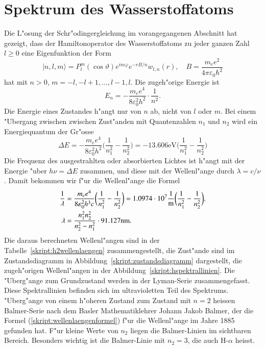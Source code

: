 \section{Spektrum des Wasserstoffatoms}
Die L"osung der Schr"odingergleichung im vorangegangenen Abschnitt
hat gezeigt, dass der Hamiltonoperator des Wasserstoffatoms zu jeder ganzen
Zahl $l\ge 0$ eine Eigenfunktion der Form
\[
|n,l,m\rangle
=
P_l^m(\cos\vartheta) e^{im\varphi}e^{-rB/n}w_{l,n}(r)
,\quad
B=\frac{m_ee^2}{4\pi\varepsilon_0\hbar^2}
\]
hat mit $n>0$, $m=-l,-l+1,\dots,l-1,l$.
Die zugeh"orige Energie ist
\[
E_n=-\frac{m_ee^4}{8\varepsilon_0^2h^2}\cdot \frac1{n^2}.
\]
Die Energie eines Zustandes h"angt nur von $n$ ab, nicht von $l$ oder $m$.
Bei einem "Ubergang zwischen zwischen Zust"anden mit Quantenzahlen $n_1$ und
$n_2$ wird ein Energiequantum der Gr"osse
\begin{equation}
\Delta E
=
-\frac{m_ee^4}{8\varepsilon_0^2h^2}
\biggl(
\frac{1}{n_1^2}
-
\frac{1}{n_2^2}
\biggr)
=
-13.606\text{eV}
\biggl(
\frac{1}{n_1^2}
-
\frac{1}{n_2^2}
\biggr)
\end{equation}
Die Frequenz des ausgestrahlten oder absorbierten Lichtes ist h"angt
mit der Energie "uber $h\nu=\Delta E$ zusammen, und diese mit der
Wellenl"ange durch $\lambda = c/\nu$.
Damit bekommen wir f"ur die Wellenl"ange die Formel
\begin{align}
\frac{1}{\lambda}
&=
\frac{m_ee^4}{8\varepsilon_0^2h^3c}
\biggl(
\frac{1}{n_1^2}
-
\frac{1}{n_2^2}
\biggr)
=
1.0974\cdot 10^7\frac1{\text{m}}
\biggl(
\frac{1}{n_1^2}
-
\frac{1}{n_2^2}
\biggr).
\notag
\\
\lambda
&=
\frac{n_1^2n_2^2}{n_2^2-n_1^2}
\cdot
91.127\text{nm}.
\label{skript:wellenlaengenformel}
\end{align}
Die daraus berechneten Wellenl"angen sind in der
Tabelle~\ref{skript:h2wellenlaengen} zusammengestellt, die
Zust"ande sind im Zustandsdiagramm in Abbildung~\ref{skript:zustandsdiagramm}
dargestellt, die zugeh"origen Wellenl"angen in der
Abbildung~\ref{skript:hspektrallinien}.
Die "Uberg"ange zum Grundzustand werden in der Lyman-Serie zusammengefasst.
Diese Spektrallinien befinden sich im ultravioletten Teil des Spektrums.
"Uberg"ange von einem h"oheren Zustand zum Zustand mit $n=2$ 
heissen Balmer-Serie nach dem Basler Mathematiklehrer Johann Jakob Balmer,
der die Formel (\ref{skript:wellenlaengenformel}) f"ur die Wellenl"ange 
im Jahre 1885 gefunden hat.
F"ur kleine Werte von $n_2$ liegen die Balmer-Linien im sichtbaren Bereich.
Besonders wichtig ist die Balmer-Linie mit $n_2=3$, die auch H-$\alpha$
heisst.

